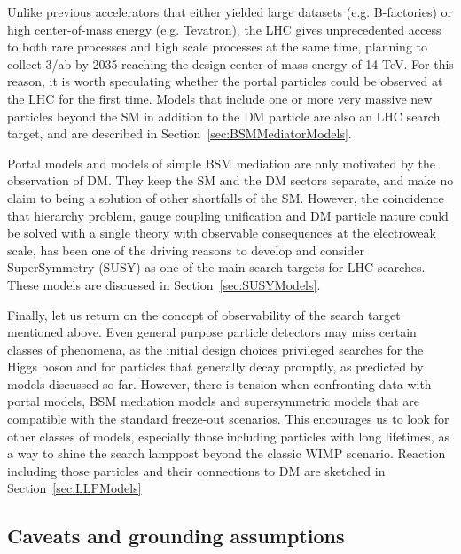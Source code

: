 Unlike previous accelerators that either yielded large datasets (e.g. B-factories) or high center-of-mass energy (e.g. Tevatron), the LHC gives unprecedented access to both rare processes and high scale processes at the same time, planning to collect 3/ab by 2035 reaching the design center-of-mass energy of 14 TeV. For this reason, it is worth speculating whether the portal particles could be observed at the LHC for the first time. Models that include one or more very massive new particles beyond the SM in addition to the DM particle are also an LHC search target, and are described in Section~\ref{sec:BSMMediatorModels}. 

Portal models and models of simple BSM mediation are only motivated by the observation of DM. They keep the SM and the DM sectors separate, and make no claim to being a solution of other shortfalls of the SM. However, the coincidence that hierarchy problem, gauge coupling unification and DM particle nature could be solved with a single theory with observable consequences at the electroweak scale, has been one of the driving reasons to develop and consider SuperSymmetry (SUSY) as one of the main search targets for LHC searches. These models are discussed in Section~\ref{sec:SUSYModels}.

Finally, let us return on the concept of observability of the search target mentioned above. Even general purpose particle detectors may miss certain classes of phenomena, as the initial design choices privileged searches for the Higgs boson and for particles that generally decay promptly, as predicted by models discussed so far. However, there is tension when confronting data with portal models, BSM mediation models and supersymmetric models that are compatible with the standard freeze-out scenarios. This encourages us to look for other classes of models, especially those including particles with long lifetimes, as a way to shine the search lamppost beyond the classic WIMP scenario. Reaction including those particles and their connections to DM are sketched in Section~\ref{sec:LLPModels}

\subsection{Caveats and grounding assumptions}
\label{sec:GroundingAssumptions}

